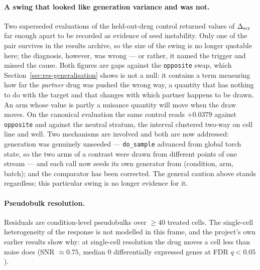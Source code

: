 \paragraph{A swing that looked like generation variance and was not.} Two superseded evaluations of
the held-out-drug control returned values of $\Delta_{\textrm{scr}}$ far enough apart to be recorded as evidence of
seed instability. Only one of the pair survives in the results archive, so the size of the swing is
no longer quotable here; the diagnosis, however, was wrong --- or rather, it named the trigger and
missed the cause. Both figures are gaps against the \texttt{opposite} swap, which
Section~\ref{sec:res-generalisation} shows is not a null: it contains a term measuring how far the
\emph{partner} drug was pushed the wrong way, a quantity that has nothing to do with the target and
that changes with which partner happens to be drawn. An arm whose value is partly a nuisance
quantity will move when the draw moves. On the canonical evaluation the same control reads $+0.0379$ against \texttt{opposite} and
 against the neutral stratum, the interval clustered two-way on cell
line and well. Two mechanisms are involved and both are now
addressed: generation was genuinely unseeded --- \texttt{do\_sample} advanced from global torch
state, so the two arms of a contrast were drawn from different points of one stream --- and each
call now seeds its own generator from (condition, arm, batch); and the comparator has been corrected.
The general caution above stands regardless; this particular swing is no longer evidence for it.

\paragraph{Pseudobulk resolution.} Residuals are condition-level pseudobulks over $\geq 40$ treated
cells. The single-cell heterogeneity of the response is not modelled in this frame, and the
project's own earlier results show why: at single-cell resolution the drug moves a cell less than
noise does (SNR $\approx 0.75$, median $0$ differentially expressed genes at FDR $q<0.05$).

